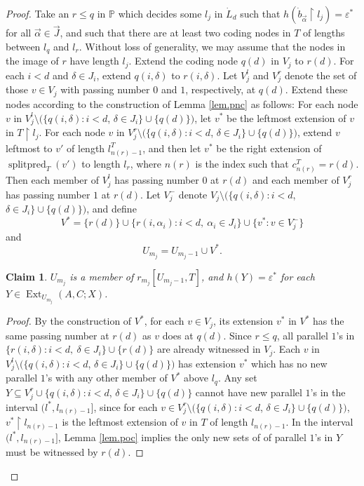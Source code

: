 \documentclass{amsart}
\newtheorem{claim}{Claim}
\theoremstyle{remark}
\theoremstyle{definition}
\theoremstyle{remark}
\newcommand{\al}{\alpha}
\newcommand{\sse}{\subseteq}
\DeclareMathOperator{\Ext}{Ext}
\DeclareMathOperator{\splitpred}{splitpred}
\newcommand{\re}{\restriction}
\newcommand{\bP}{\mathbb{P}}
\begin{document}
\begin{proof}
Take an $r\le q$ in  $\bP$ which  decides some $l_j$ in $\dot{L}_d$ such that  $h(\dot{b}_{\vec\al}\re l_j)=\varepsilon^*$ for all $\vec\al\in\vec{J}$, and such that there are at least two coding nodes in $T$ of lengths between $l_q$ and $l_r$.
Without loss of generality, we may assume that
 the nodes in the image of $r$ have length  $l_j$.
Extend the coding  node $q(d)$ in $V_j$
to $r(d)$.
For each $i<d$ and $\delta\in J_i$,
extend $q(i,\delta)$ to $r(i,\delta)$.
Let $V_j^l$ and $V_j^r$  denote the set of those
$v\in V_j$ with passing number $0$ and $1$, respectively, at $q(d)$.
Extend these nodes  according to the construction of Lemma \ref{lem.pnc} as follows:
For each node $v$ in $V_j^l\setminus(\{q(i,\delta):i<d$, $\delta\in J_i\}\cup \{q(d)\})$,
let $v^*$ be the  leftmost extension of $v$ in $T\re l_j$.
For each node $v$ in $V_j^r\setminus(\{q(i,\delta):i<d$, $\delta\in J_i\}\cup \{q(d)\})$,
extend $v$ leftmost to $v'$
of length $l^T_{n(r)-1}$, and
then let $v^*$ be the right extension of $\splitpred_T(v')$ to  length $l_r$,
where $n(r)$ is the index such that $c^T_{n(r)}=r(d)$.
Then each member of $V_j^l$ has passing number $0$ at $r(d)$ and each member of $V_j^r$ has passing number $1$ at $r(d)$.
Let
 $V_j^-$ denote $V_j\setminus(\{q(i,\delta):i<d$, $\delta\in J_i\}\cup \{q(d)\})$,
and define
\begin{equation}
V^*=\{r(d)\}\cup\{r(i,\al_i):i<d,\ \al_i\in J_i\}\cup\{v^*:v\in V_j^-\}
\end{equation}
and
\begin{equation}
U_{m_j}=U_{m_j-1}\cup V^*.
\end{equation}



\begin{claim}\label{claim.correct}
$U_{m_j}$ is a member of  $r_{m_j}[U_{m_j-1},T]$, and
$h(Y)=\varepsilon^*$
for each  $Y\in\Ext_{U_{m_j}}(A,C;X)$.
\end{claim}



\begin{proof}
By the construction of   $V^*$,
for each $v\in V_j$,
its extension $v^*$ in $V^*$ has the same passing number at $r(d)$ as $v$ does at $q(d)$.
Since $r\le q$,
all parallel $1$'s in $\{r(i,\delta):i<d,\ \delta\in J_i\}\cup\{r(d)\}$ are already witnessed in $V_j$.
Each $v$ in
$V_j^l\setminus(\{q(i,\delta):i<d$, $\delta\in J_i\}\cup \{q(d)\})$
has extension $v^*$ which has no new parallel $1$'s with any other member of $V^*$ above $l_q$.
Any set $Y\sse V_j^r\cup \{q(i,\delta):i<d$, $\delta\in J_i\}\cup \{q(d)\}$
cannot have new parallel $1$'s in the interval
$(l^*, l_{n(r)-1}]$, since for each
$v\in V_j^r\setminus (\{q(i,\delta):i<d$, $\delta\in J_i\}\cup \{q(d)\})$,
$v^*\re l_{n(r)-1}$ is the leftmost extension of $v$ in $T$ of  length  $l_{n(r)-1}$.
In the interval  $(l^*, l_{n(r)-1}]$,
Lemma \ref{lem.poc} implies the only new sets of  of parallel $1$'s  in $Y$  must be witnessed by $r(d)$.





\end{proof}
\end{proof}
\end{document}
